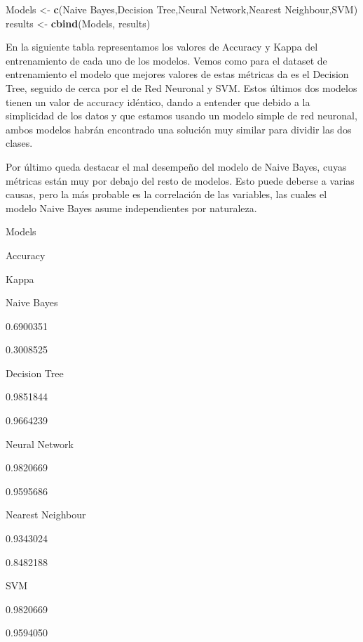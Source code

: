 \documentclass[
]{article}
\newenvironment{Shaded}{\begin{snugshade}}{\end{snugshade}}
\newcommand{\FunctionTok}[1]{\textcolor[rgb]{0.13,0.29,0.53}{\textbf{#1}}}
\newcommand{\NormalTok}[1]{#1}
\newcommand{\OtherTok}[1]{\textcolor[rgb]{0.56,0.35,0.01}{#1}}
\newcommand{\StringTok}[1]{\textcolor[rgb]{0.31,0.60,0.02}{#1}}
\begin{document}
\begin{Shaded}
\begin{Highlighting}[]
\NormalTok{Models }\OtherTok{\textless{}{-}} \FunctionTok{c}\NormalTok{(}\StringTok{\textquotesingle{}Naive Bayes\textquotesingle{}}\NormalTok{,}\StringTok{\textquotesingle{}Decision Tree\textquotesingle{}}\NormalTok{,}\StringTok{\textquotesingle{}Neural Network\textquotesingle{}}\NormalTok{,}\StringTok{\textquotesingle{}Nearest Neighbour\textquotesingle{}}\NormalTok{,}\StringTok{\textquotesingle{}SVM\textquotesingle{}}\NormalTok{)}
\NormalTok{results }\OtherTok{\textless{}{-}} \FunctionTok{cbind}\NormalTok{(Models, results)}
\end{Highlighting}
\end{Shaded}

En la siguiente tabla representamos los valores de Accuracy y Kappa del
entrenamiento de cada uno de los modelos. Vemos como para el dataset de
entrenamiento el modelo que mejores valores de estas métricas da es el
Decision Tree, seguido de cerca por el de Red Neuronal y SVM. Estos
últimos dos modelos tienen un valor de accuracy idéntico, dando a
entender que debido a la simplicidad de los datos y que estamos usando
un modelo simple de red neuronal, ambos modelos habrán encontrado una
solución muy similar para dividir las dos clases.

Por último queda destacar el mal desempeño del modelo de Naive Bayes,
cuyas métricas están muy por debajo del resto de modelos. Esto puede
deberse a varias causas, pero la más probable es la correlación de las
variables, las cuales el modelo Naive Bayes asume independientes por
naturaleza.

Models

Accuracy

Kappa

Naive Bayes

0.6900351

0.3008525

Decision Tree

0.9851844

0.9664239

Neural Network

0.9820669

0.9595686

Nearest Neighbour

0.9343024

0.8482188

SVM

0.9820669

0.9594050

\subsection{}\label{section-6}
\end{document}
